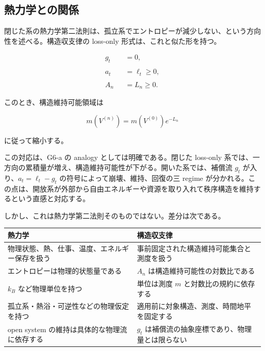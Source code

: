 \documentclass[12pt,a4paper]{article}
\begin{document}
\subsection{熱力学との関係}\label{ux71b1ux529bux5b66ux3068ux306eux95a2ux4fc2}

閉じた系の熱力学第二法則は、孤立系でエントロピーが減少しない、という方向性を述べる。構造収支律の loss-only 形式は、これと似た形を持つ。

\[
\begin{aligned}
g_{t}&=0, \\
\qquad \\
a_{t}&=\ell_{t}\ge 0, \\
\qquad \\
A_{n}&=L_{n}\ge 0.
\end{aligned}
\]

このとき、構造維持可能領域は

\[
m(V^{(n)})=m(V^{(0)})e^{-L_{n}}
\]

に従って縮小する。

この対応は、G6-a の analogy としては明確である。閉じた loss-only 系では、一方向の累積量が増え、構造維持可能性が下がる。開いた系では、補償流 \(g_{t}\) が入り、\(a_{t}=\ell_{t}-g_{t}\) の符号によって崩壊、維持、回復の三 regime が分かれる。この点は、開放系が外部から自由エネルギーや資源を取り入れて秩序構造を維持するという直感と対応する。

しかし、これは熱力学第二法則そのものではない。差分は次である。

{\def\LTcaptype{table} %
\begin{longtable}[]{@{}
  >{\raggedright\arraybackslash}p{}
  >{\raggedright\arraybackslash}p{}@{}}
\toprule\noalign{}
\begin{minipage}[b]{\linewidth}\raggedright
熱力学
\end{minipage} & \begin{minipage}[b]{\linewidth}\raggedright
構造収支律
\end{minipage} \\
\midrule\noalign{}
\endhead
\bottomrule\noalign{}
\endlastfoot
物理状態、熱、仕事、温度、エネルギー保存を扱う & 事前固定された構造維持可能集合と測度を扱う \\
エントロピーは物理的状態量である & \(A_n\) は構造維持可能性の対数比である \\
\(k_B\) など物理単位を持つ & 単位は測度 \(m\) と対数比の規約に依存する \\
孤立系・熱浴・可逆性などの物理仮定を持つ & 適用前に対象構造、測度、時間地平を固定する \\
open system の維持は具体的な物理流に依存する & \(g_t\) は補償流の抽象座標であり、物理量とは限らない \\
\end{longtable}
}
\end{document}
